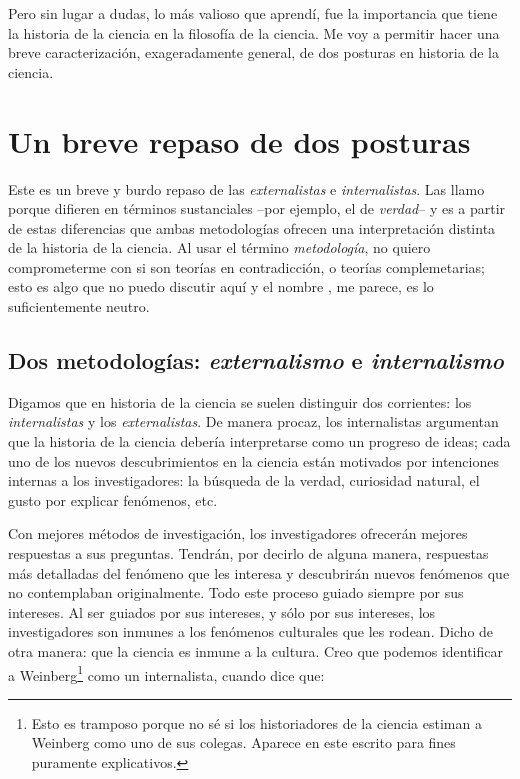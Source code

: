 Pero sin lugar a dudas, lo más valioso que aprendí, fue la importancia que tiene la historia de la ciencia en la filosofía de la ciencia.
Me voy a permitir hacer una breve caracterización, exageradamente general, de dos posturas en historia de la ciencia.


\section{Un breve repaso de dos posturas}

\noindent Este es un breve y burdo repaso de las  \emph{externalistas} e \emph{internalistas}.
Las llamo  porque difieren en términos sustanciales --por ejemplo, el de \emph{verdad}-- y es a partir de estas diferencias que ambas metodologías ofrecen una interpretación distinta de la historia de la ciencia.
Al usar el término \emph{metodología}, no quiero comprometerme con si son teorías en contradicción, o teorías complemetarias; esto es algo que no puedo discutir aquí y el nombre , me parece, es lo suficientemente neutro.


\subsection{Dos metodologías: \emph{externalismo} e \emph{internalismo}}

\noindent Digamos que en historia de la ciencia se suelen distinguir dos corrientes: los \emph{internalistas} y los \emph{externalistas}.
De manera procaz, los internalistas argumentan que la historia de la ciencia debería interpretarse como un progreso de ideas; cada uno de los nuevos descubrimientos en la ciencia están motivados por intenciones internas a los investigadores: la búsqueda de la verdad, curiosidad natural, el gusto por explicar fenómenos, etc.

Con mejores métodos de investigación, los investigadores ofrecerán mejores respuestas a sus preguntas.
Tendrán, por decirlo de alguna manera, respuestas más detalladas del fenómeno que les interesa y descubrirán nuevos fenómenos que no contemplaban originalmente.
Todo este proceso guiado siempre por sus intereses.
Al ser guiados por sus intereses, y sólo por sus intereses, los investigadores son inmunes a los fenómenos culturales que les rodean.
Dicho de otra manera: que la ciencia es inmune a la cultura.
Creo que podemos identificar a Weinberg\footnote{
	Esto es tramposo porque no sé si los historiadores de la ciencia estiman a Weinberg como uno de sus colegas.
	Aparece en este escrito para fines puramente explicativos.
	} como un internalista, cuando dice que:

